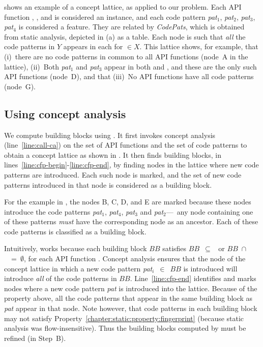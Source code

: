  shows an example of a concept lattice, as applied to
our problem. Each API function , , 
and  is considered an instance, and each code pattern
\textit{pat$_1$}, \textit{pat$_2$}, \textit{pat$_3$}, \textit{pat$_4$} is
considered a feature. They are related by \textit{CodePats}, which is obtained
from static analysis, depicted in (a) as a table.
Each node  is such that \textit{all} the code patterns in $Y$
appears in each  for $\in$$X$. This lattice
shows, for example, that (i)~there are no code patterns in common to all API
functions (node~\textsf{A} in the lattice), (ii)~Both \textit{pat$_1$} and
\textit{pat$_3$} appear in both  and ,
and these are the only such API functions (node~\textsf{D}), and that (iii)~No
API functions have all code patterns (node~\textsf{G}).

\subsection{Using concept analysis}
%
We compute building blocks using . It first
invokes concept analysis (line~\ref{line:call-ca}) on the set of API functions
and the set of code patterns to obtain a concept lattice as shown in
. It then finds building blocks, in
lines~\ref{line:cfp-begin}-\ref{line:cfp-end}, by finding nodes in the lattice
where new code patterns are introduced. Each such node is marked, and the set
of new code patterns introduced in that node is considered as a building block.

For the example in , the nodes \textsf{B},
\textsf{C}, \textsf{D}, and \textsf{E} are marked because these nodes introduce
the code patterns \textit{pat$_1$}, \textit{pat$_4$}, \textit{pat$_3$} and
\textit{pat$_2$}---\ie~any node containing one of these patterns \textit{must}
have the corresponding node as an ancestor. Each of these code patterns is
classified as a building block. 

Intuitively,  works because each building block $BB$
satisfies $BB$~$\subseteq$~ or
$BB$~$\cap$~~=~$\emptyset$, for each API function
. Concept analysis ensures that the node of the concept lattice
in which a new code pattern \textit{pat$_i$}~$\in$~$BB$ is introduced will
introduce \textit{all} of the code patterns in $BB$. Line~\ref{line:cfp-end}
identifies and marks nodes where a new code pattern \textit{pat} is introduced
into the lattice.  Because of the property above, all the code patterns that
appear in the same building block as \textit{pat} appear in that node. Note
however, that code patterns in each building block may not satisfy
Property~\ref{chapter:static:property:fingerprint} (because static analysis was
flow-insensitive). Thus the building blocks computed by
 must be refined (in Step~B).

